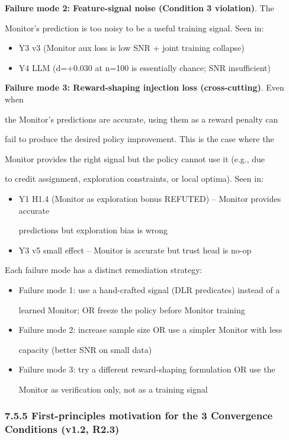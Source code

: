 \documentclass[11pt]{article}
\begin{document}
\textbf{Failure mode 2: Feature-signal noise (Condition 3 violation)}.
The

Monitor's prediction is too noisy to be a useful training signal. Seen
in:

\begin{itemize}
\item
  Y3 v3 (Monitor aux loss is low SNR + joint training collapse)
\item
  Y4 LLM (d=+0.030 at n=100 is essentially chance; SNR insufficient)
\end{itemize}

\textbf{Failure mode 3: Reward-shaping injection loss (cross-cutting)}.
Even when

the Monitor's predictions are accurate, using them as a reward penalty
can

fail to produce the desired policy improvement. This is the case where
the

Monitor provides the right signal but the policy cannot use it (e.g.,
due

to credit assignment, exploration constraints, or local optima). Seen
in:

\begin{itemize}
\item
  Y1 H1.4 (Monitor as exploration bonus REFUTED) -- Monitor provides
  accurate

  predictions but exploration bias is wrong
\item
  Y3 v5 small effect -- Monitor is accurate but trust head is no-op
\end{itemize}

Each failure mode has a distinct remediation strategy:

\begin{itemize}
\item
  Failure mode 1: use a hand-crafted signal (DLR predicates) instead of
  a

  learned Monitor; OR freeze the policy before Monitor training
\item
  Failure mode 2: increase sample size OR use a simpler Monitor with
  less

  capacity (better SNR on small data)
\item
  Failure mode 3: try a different reward-shaping formulation OR use the

  Monitor as verification only, not as a training signal
\end{itemize}

\subsubsection{7.5.5 First-principles motivation for the 3 Convergence
Conditions (v1.2,
R2.3)}\label{first-principles-motivation-for-the-3-convergence-conditions-v1.2-r2.3}
\end{document}
